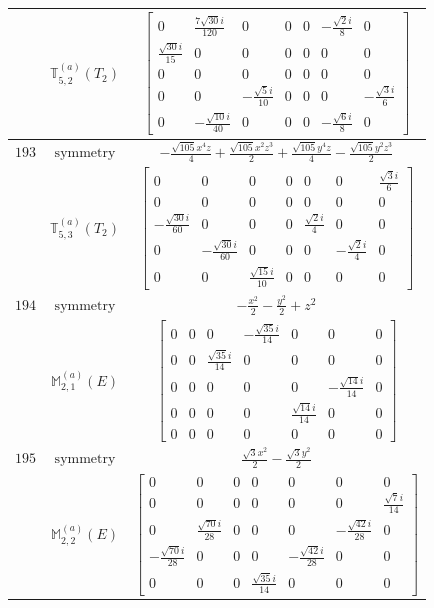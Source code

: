\documentclass[fleqn,8pt,landscape]{jsarticle}
\begin{document}
\begin{longtable}{ccc}
$  $ & $ \mathbb{T}_{5,2}^{(a)}(T_{2}) $ & $ \begin{bmatrix} 0 & \frac{7 \sqrt{30} i}{120} & 0 & 0 & 0 & - \frac{\sqrt{2} i}{8} & 0 \\ \frac{\sqrt{30} i}{15} & 0 & 0 & 0 & 0 & 0 & 0 \\ 0 & 0 & 0 & 0 & 0 & 0 & 0 \\ 0 & 0 & - \frac{\sqrt{5} i}{10} & 0 & 0 & 0 & - \frac{\sqrt{3} i}{6} \\ 0 & - \frac{\sqrt{10} i}{40} & 0 & 0 & 0 & - \frac{\sqrt{6} i}{8} & 0 \end{bmatrix} $ \\ \hline
$ 193 $ & $ \text{symmetry} $ & $ - \frac{\sqrt{105} x^{4} z}{4} + \frac{\sqrt{105} x^{2} z^{3}}{2} + \frac{\sqrt{105} y^{4} z}{4} - \frac{\sqrt{105} y^{2} z^{3}}{2} $ \\
$  $ & $ \mathbb{T}_{5,3}^{(a)}(T_{2}) $ & $ \begin{bmatrix} 0 & 0 & 0 & 0 & 0 & 0 & \frac{\sqrt{3} i}{6} \\ 0 & 0 & 0 & 0 & 0 & 0 & 0 \\ - \frac{\sqrt{30} i}{60} & 0 & 0 & 0 & \frac{\sqrt{2} i}{4} & 0 & 0 \\ 0 & - \frac{\sqrt{30} i}{60} & 0 & 0 & 0 & - \frac{\sqrt{2} i}{4} & 0 \\ 0 & 0 & \frac{\sqrt{15} i}{10} & 0 & 0 & 0 & 0 \end{bmatrix} $ \\ \hline
$ 194 $ & $ \text{symmetry} $ & $ - \frac{x^{2}}{2} - \frac{y^{2}}{2} + z^{2} $ \\
$  $ & $ \mathbb{M}_{2,1}^{(a)}(E) $ & $ \begin{bmatrix} 0 & 0 & 0 & - \frac{\sqrt{35} i}{14} & 0 & 0 & 0 \\ 0 & 0 & \frac{\sqrt{35} i}{14} & 0 & 0 & 0 & 0 \\ 0 & 0 & 0 & 0 & 0 & - \frac{\sqrt{14} i}{14} & 0 \\ 0 & 0 & 0 & 0 & \frac{\sqrt{14} i}{14} & 0 & 0 \\ 0 & 0 & 0 & 0 & 0 & 0 & 0 \end{bmatrix} $ \\ \hline
$ 195 $ & $ \text{symmetry} $ & $ \frac{\sqrt{3} x^{2}}{2} - \frac{\sqrt{3} y^{2}}{2} $ \\
$  $ & $ \mathbb{M}_{2,2}^{(a)}(E) $ & $ \begin{bmatrix} 0 & 0 & 0 & 0 & 0 & 0 & 0 \\ 0 & 0 & 0 & 0 & 0 & 0 & \frac{\sqrt{7} i}{14} \\ 0 & \frac{\sqrt{70} i}{28} & 0 & 0 & 0 & - \frac{\sqrt{42} i}{28} & 0 \\ - \frac{\sqrt{70} i}{28} & 0 & 0 & 0 & - \frac{\sqrt{42} i}{28} & 0 & 0 \\ 0 & 0 & 0 & \frac{\sqrt{35} i}{14} & 0 & 0 & 0 \end{bmatrix} $ \\ \hline

\end{longtable}
\end{document}

